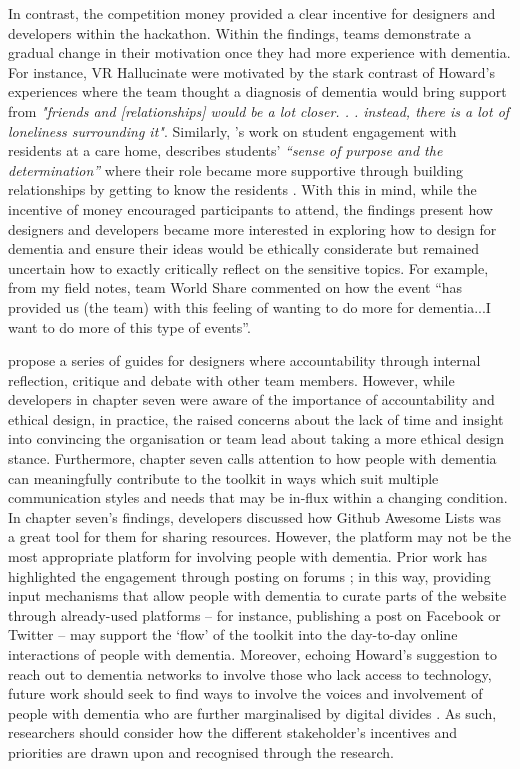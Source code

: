 In contrast, the competition money provided a clear incentive for designers and developers within the hackathon. Within the findings, teams demonstrate a gradual change in their motivation once they had more experience with dementia. For instance, VR Hallucinate were motivated by the stark contrast of Howard’s experiences where the team thought a diagnosis of dementia would bring support from \textit{"friends and [relationships] would be a lot closer. . . instead, there is a lot of loneliness surrounding it"}. Similarly, \citeauthor{foley_student_2020}'s work on student engagement with residents at a care home, describes students' \textit{``sense of purpose and the determination''} where their role became more supportive through building relationships by getting to know the residents \citep{foley_student_2020}. With this in mind, while the incentive of money encouraged participants to attend, the findings present how designers and developers became more interested in exploring how to design for dementia and ensure their ideas would be ethically considerate but remained uncertain how to exactly critically reflect on the sensitive topics. For example, from my field notes, team World Share commented on how the event ``has provided us (the team) with this feeling of wanting to do more for dementia...I want to do more of this type of events''.

\cite{frauenberger2015pursuit} propose a series of guides for designers where accountability through internal reflection, critique and debate with other team members. However, while developers in chapter seven were aware of the importance of accountability and ethical design, in practice, the raised concerns about the lack of time and insight into convincing the organisation or team lead about taking a more ethical design stance. Furthermore, chapter seven calls attention to how people with dementia can meaningfully contribute to the toolkit in ways which suit multiple communication styles and needs that may be in-flux within a changing condition. In chapter seven's findings, developers discussed how Github Awesome Lists was a great tool for them for sharing resources. However, the platform may not be the most appropriate platform for involving people with dementia. Prior work has highlighted the engagement through posting on forums \citep{johnson2020roles}; in this way, providing input mechanisms that allow people with dementia to curate parts of the website through already-used platforms – for instance, publishing a post on Facebook or Twitter \citep{talbot_how_2020} – may support the ‘flow’ of the toolkit into the day-to-day online interactions of people with dementia. Moreover, echoing Howard’s suggestion to reach out to dementia networks to involve those who lack access to technology, future work should seek to find ways to involve the voices and involvement of people with dementia who are further marginalised by digital divides \citep{harrington_forgotten_2020}. As such, researchers should consider how the different stakeholder's incentives and priorities are drawn upon and recognised through the research.

